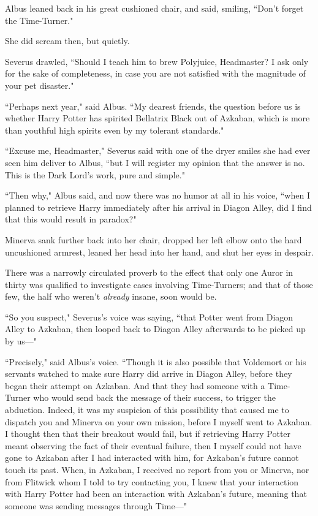 Albus leaned back in his great cushioned chair, and said, smiling, ``Don't forget the Time-Turner."

She did scream then, but quietly.

Severus drawled, ``Should I teach him to brew Polyjuice, Headmaster? I ask only for the sake of completeness, in case you are not satisfied with the magnitude of your pet disaster."

``Perhaps next year," said Albus. ``My dearest friends, the question before us is whether Harry Potter has spirited Bellatrix Black out of Azkaban, which is more than youthful high spirits even by my tolerant standards."

``Excuse me, Headmaster," Severus said with one of the dryer smiles she had ever seen him deliver to Albus, ``but I will register my opinion that the answer is no. This is the Dark Lord's work, pure and simple."

``Then why," Albus said, and now there was no humor at all in his voice, ``when I planned to retrieve Harry immediately after his arrival in Diagon Alley, did I find that this would result in paradox?"

Minerva sank further back into her chair, dropped her left elbow onto the hard uncushioned armrest, leaned her head into her hand, and shut her eyes in despair.

There was a narrowly circulated proverb to the effect that only one Auror in thirty was qualified to investigate cases involving Time-Turners; and that of those few, the half who weren't \emph{already} insane, soon would be.

``So you suspect," Severus's voice was saying, ``that Potter went from Diagon Alley to Azkaban, then looped back to Diagon Alley afterwards to be picked up by us---"

``Precisely," said Albus's voice. ``Though it is also possible that Voldemort or his servants watched to make sure Harry did arrive in Diagon Alley, before they began their attempt on Azkaban. And that they had someone with a Time-Turner who would send back the message of their success, to trigger the abduction. Indeed, it was my suspicion of this possibility that caused me to dispatch you and Minerva on your own mission, before I myself went to Azkaban. I thought then that their breakout would fail, but if retrieving Harry Potter meant observing the fact of their eventual failure, then I myself could not have gone to Azkaban after I had interacted with him, for Azkaban's future cannot touch its past. When, in Azkaban, I received no report from you or Minerva, nor from Flitwick whom I told to try contacting you, I knew that your interaction with Harry Potter had been an interaction with Azkaban's future, meaning that someone was sending messages through Time---"

